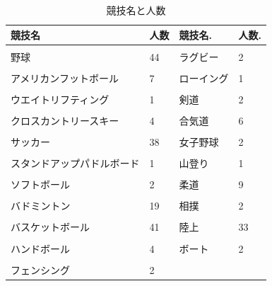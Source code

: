 \documentclass[12pt,a4paper,xelatex,ja=standard]{bxjsarticle}
\begin{document}
\begin{table}[!h]
\centering
\caption{\label{tab:unnamed-chunk-2}競技名と人数}
\centering
\fontsize{7}{9}\selectfont
\begin{tabular}[t]{llll}
\toprule
競技名 & 人数 & 競技名. & 人数.\\
\midrule
\cellcolor[HTML]{F5F5F5}{テニス} & \cellcolor[HTML]{F5F5F5}{13} & \cellcolor[HTML]{F5F5F5}{ライフセービング} & \cellcolor[HTML]{F5F5F5}{1}\\
野球 & 44 & ラグビー & 2\\
\cellcolor[HTML]{F5F5F5}{アイスホッケー} & \cellcolor[HTML]{F5F5F5}{5} & \cellcolor[HTML]{F5F5F5}{レスリング} & \cellcolor[HTML]{F5F5F5}{6}\\
アメリカンフットボール & 7 & ローイング & 1\\
\cellcolor[HTML]{F5F5F5}{アルペンスキー} & \cellcolor[HTML]{F5F5F5}{3} & \cellcolor[HTML]{F5F5F5}{体操} & \cellcolor[HTML]{F5F5F5}{6}\\
\addlinespace
ウエイトリフティング & 1 & 剣道 & 2\\
\cellcolor[HTML]{F5F5F5}{オーストラリアンフットボール} & \cellcolor[HTML]{F5F5F5}{6} & \cellcolor[HTML]{F5F5F5}{卓球} & \cellcolor[HTML]{F5F5F5}{10}\\
クロスカントリースキー & 4 & 合気道 & 6\\
\cellcolor[HTML]{F5F5F5}{ゴルフ} & \cellcolor[HTML]{F5F5F5}{5} & \cellcolor[HTML]{F5F5F5}{女子サーブル} & \cellcolor[HTML]{F5F5F5}{1}\\
サッカー & 38 & 女子野球 & 2\\
\addlinespace
\cellcolor[HTML]{F5F5F5}{ランニング} & \cellcolor[HTML]{F5F5F5}{1} & \cellcolor[HTML]{F5F5F5}{射撃} & \cellcolor[HTML]{F5F5F5}{1}\\
スタンドアップパドルボード & 1 & 山登り & 1\\
\cellcolor[HTML]{F5F5F5}{ソフトテニス} & \cellcolor[HTML]{F5F5F5}{45} & \cellcolor[HTML]{F5F5F5}{新体操} & \cellcolor[HTML]{F5F5F5}{2}\\
ソフトボール & 2 & 柔道 & 9\\
\cellcolor[HTML]{F5F5F5}{ダンス} & \cellcolor[HTML]{F5F5F5}{1} & \cellcolor[HTML]{F5F5F5}{水泳} & \cellcolor[HTML]{F5F5F5}{7}\\
\addlinespace
バドミントン & 19 & 相撲 & 2\\
\cellcolor[HTML]{F5F5F5}{トライアスロン} & \cellcolor[HTML]{F5F5F5}{2} & \cellcolor[HTML]{F5F5F5}{空手} & \cellcolor[HTML]{F5F5F5}{3}\\
バスケットボール & 41 & 陸上 & 33\\
\cellcolor[HTML]{F5F5F5}{バレーボール} & \cellcolor[HTML]{F5F5F5}{17} & \cellcolor[HTML]{F5F5F5}{駅伝} & \cellcolor[HTML]{F5F5F5}{1}\\
ハンドボール & 4 & ボート & 2\\
\addlinespace
\cellcolor[HTML]{F5F5F5}{ビーチバレーボール} & \cellcolor[HTML]{F5F5F5}{1} & \cellcolor[HTML]{F5F5F5}{ボウリング} & \cellcolor[HTML]{F5F5F5}{1}\\
フェンシング & 2 &  & \\
\bottomrule
\end{tabular}
\end{table}
\end{document}
